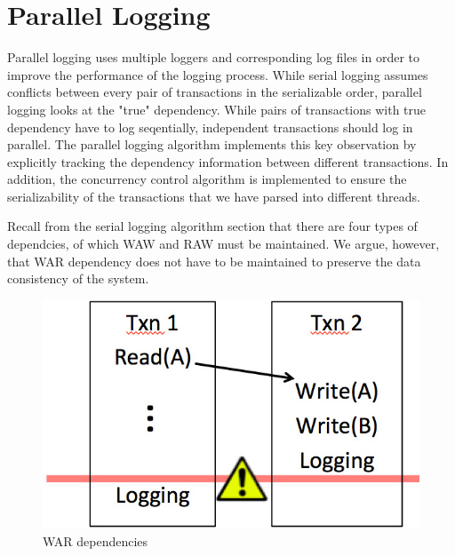 \section{Parallel Logging}
Parallel logging uses multiple loggers and corresponding log files in order to improve the performance of the logging process. While serial logging assumes conflicts between every pair of transactions in the serializable order, parallel logging looks at the "true" dependency. While pairs of transactions with true dependency have to log seqentially, independent transactions should log in parallel. The parallel logging algorithm implements this key observation by explicitly tracking the dependency information between different transactions. In addition, the concurrency control algorithm is implemented to ensure the serializability of the transactions that we have parsed into different threads. \par


Recall from the serial logging algorithm section that there are four types of dependcies, of which WAW and RAW must be maintained. We argue, however, that WAR dependency does not have to be maintained to preserve the data consistency of the system. 
\begin{figure}[!h]
\caption{WAR dependencies}
\includegraphics[width=\textwidth]{WAR.jpg}
\end{figure}\\

